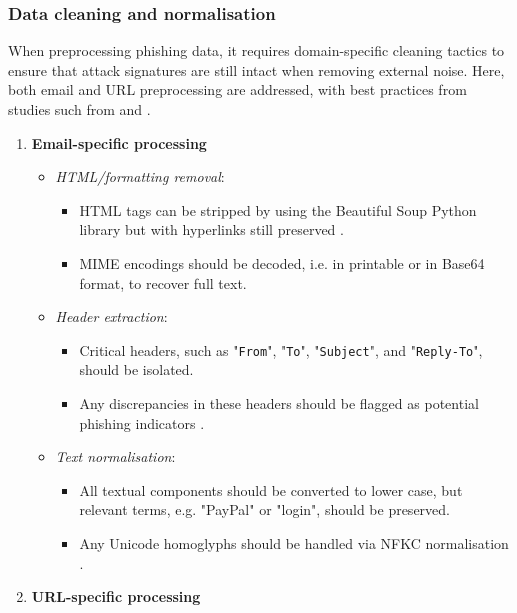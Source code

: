 
\subsubsection*{Data cleaning and normalisation}
When preprocessing phishing data, it requires domain-specific cleaning tactics to ensure that attack signatures are still intact when removing external noise. Here, both email and URL preprocessing are addressed, with best practices from studies such from \cite{zamir2020phishing} and \cite{ahmad2024across}.

\begin{enumerate}
  \item \textbf{Email-specific processing}
  \begin{itemize}
    \item \textit{HTML/formatting removal}:
    \begin{itemize}
      \item HTML tags can be stripped by using the Beautiful Soup Python library \cite{beautifulsoup2025} but with hyperlinks still preserved \citep{bravo2010bridging}.
      \item MIME encodings should be decoded, i.e. in printable or in Base64 format, to recover full text.
    \end{itemize}
    \item \textit{Header extraction}:
    \begin{itemize}
      \item Critical headers, such as "\texttt{From}", "\texttt{To}", "\texttt{Subject}", and "\texttt{Reply-To}", should be isolated.
      \item Any discrepancies in these headers should be flagged as potential phishing indicators \citep{lin2021phishpedia}.
    \end{itemize}
    \item \textit{Text normalisation}:
    \begin{itemize}
      \item All textual components should be converted to lower case, but relevant terms, e.g. "PayPal" or "login", should be preserved.
      \item Any Unicode homoglyphs should be handled via NFKC normalisation \citep{andriu2023adaptive}.
    \end{itemize}
  \end{itemize}
  \item \textbf{URL-specific processing}

\end{enumerate}
